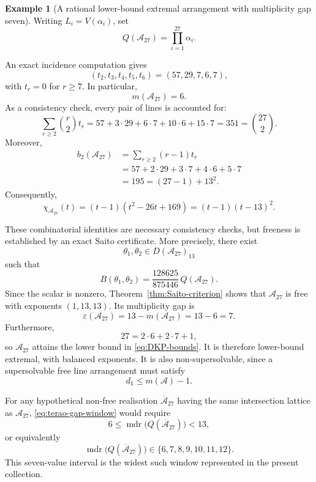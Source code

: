 \documentclass[pdflatex,sn-mathphys-num]{sn-jnl}%
\renewcommand{\epsilon}{\varepsilon}
\theoremstyle{remark}
\theoremstyle{definition}
\newtheorem{example}{Example}
\begin{document}
\begin{example}[A rational lower-bound extremal arrangement with multiplicity gap seven]
Writing $L_i=V(\alpha_i)$, set
\[
Q({\mathcal{A}_{27}})=\prod_{i=1}^{27}\alpha_i.
\]

An exact incidence computation gives
\begin{equation}
\label{eq:epsilon-seven-profile}
(t_2,t_3,t_4,t_5,t_6)
=
(57,29,7,6,7),
\end{equation}
with $t_r=0$ for $r\geq7$. In particular,
\[
m(\mathcal{A}_{27})=6.
\]
As a consistency check, every pair of lines is accounted for:
\[
\sum_{r\geq2}\binom{r}{2}t_r
=
57+3\cdot29+6\cdot7+10\cdot6+15\cdot7
=
351
=
\binom{27}{2}.
\]
Moreover,
\[
\begin{aligned}
b_2(\mathcal{A}_{27})
&=
\sum_{r\geq2}(r-1)t_r\\
&=
57+2\cdot29+3\cdot7+4\cdot6+5\cdot7\\
&=
195
=
(27-1)+13^2.
\end{aligned}
\]
Consequently,
\[
\chi_{\mathcal{A}_{27}}(t)
=
(t-1)(t^2-26t+169)
=
(t-1)(t-13)^2.
\]

These combinatorial identities are necessary consistency checks, but freeness is established by an exact Saito certificate. More precisely,
there exist
\[
\theta_1,\theta_2\in D(\mathcal{A}_{27})_{13}
\]
such that
\[
B(\theta_1,\theta_2)
=
\frac{128625}{875446}\,Q({\mathcal{A}_{27}}).
\]
Since the scalar is nonzero, Theorem~\ref{thm:Saito-criterion} shows that $\mathcal{A}_{27}$ is free with exponents $(1,13,13)$. Its multiplicity gap is
\[
\epsilon(\mathcal{A}_{27})
=
13-m(\mathcal{A}_{27})
=
13-6
=
7.
\]
Furthermore,
\[
27=2\cdot6+2\cdot7+1,
\]
so $\mathcal{A}_{27}$ attains the lower bound in
\eqref{eq:DKP-bounds}. It is therefore lower-bound extremal, with balanced
exponents. It is also non-supersolvable, since a supersolvable free line
arrangement must satisfy
\[
d_1\leq m(\mathcal{A})-1.
\]

For any hypothetical non-free realisation $\overline{\mathcal{A}}_{27}$ having the same intersection lattice as $\mathcal{A}_{27}$,
\eqref{eq:terao-gap-window} would require
\[
6
\leq
\operatorname{mdr}\bigl(Q({\overline{\mathcal{A}}_{27}})\bigr)
<
13,
\]
or equivalently
\[
\operatorname{mdr}\bigl(Q({\overline{\mathcal{A}}_{27}})\bigr)
\in
\{6,7,8,9,10,11,12\}.
\]
This seven-value interval is the widest such window represented in the present collection.

\end{example}
\end{document}

